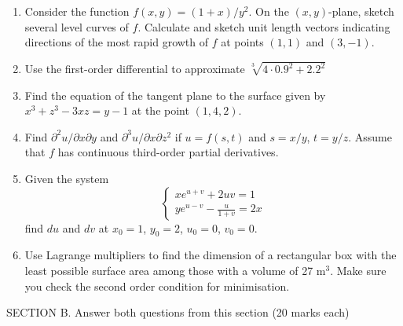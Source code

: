 \documentclass[12pt]{article} %
\theoremstyle{definition} %
\begin{document}
\begin{enumerate}

\item Consider the function $f(x,y)=(1+x)/y^2$. On the $(x,y)$-plane, sketch several level curves of $f$. Calculate and sketch unit length vectors indicating directions of the most rapid growth of $f$ at points $(1, 1)$ and $(3, -1)$.

\item Use the first-order differential to approximate
$\sqrt[3]{4\cdot 0.9^2+2.2^2}$

\item Find the equation of the tangent plane to the surface given by $x^3+z^3-3xz=y-1$ at the point $(1, 4, 2)$.

\item Find $\partial^2 u / \partial x \partial y$ and $\partial^3 u / \partial x \partial z^2$ if $u=f(s,t)$ and $s=x/y$, $t=y/z$. Assume that $f$ has continuous third-order partial derivatives.

\item Given the system
\[
\begin{cases}
xe^{u+v}+2uv=1 \\
ye^{u-v}-\frac{u}{1+v}=2x
\end{cases}
\]
find $du$ and $dv$ at $x_0 = 1$, $y_0 = 2$, $u_0 = 0$, $v_0 = 0$.

\item Use Lagrange multipliers to find the dimension of a rectangular box with the least
possible surface area among those with a volume of 27 m$^3$. Make sure you check the second
order condition for minimisation.
\end{enumerate}

SECTION B. Answer both questions from this section (20 marks each)
\end{document}
